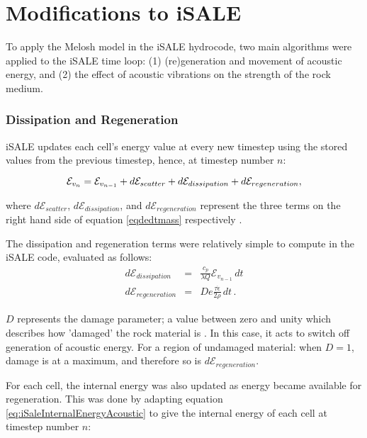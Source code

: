 \appendix

\section{Modifications to iSALE} \label{app:modifications}

To apply the Melosh model in the iSALE hydrocode, two main algorithms were applied to the iSALE time loop: (1) (re)generation and movement of acoustic energy, and (2) the effect of acoustic vibrations on the strength of the rock medium.

\subsubsection{Dissipation and Regeneration \label{sec:dissandregen}}

iSALE updates each cell's energy value at every new timestep using the stored values from the previous timestep, hence, at timestep number $n$:

\begin{equation}\label{eq:iSaleStep}
\mathcal{E}_{v_{n}} = \mathcal{E}_{v_{n-1}} + d\mathcal{E}_{scatter} + d\mathcal{E}_{dissipation} + d\mathcal{E}_{regeneration},\vspace{0.2cm}
\end{equation}

where $d\mathcal{E}_{scatter}$, $d\mathcal{E}_{dissipation}$, and $d\mathcal{E}_{regeneration}$ represent the three terms on the right hand side of equation \ref{eqdedtmass} respectively \citep{collins2003acoustic}.

The dissipation and regeneration terms were relatively simple to compute in the iSALE code, evaluated as follows:
\vspace{0.0cm}
\begin{eqnarray}
d\mathcal{E}_{dissipation} &=& \frac{c_{p}}{\lambda Q}\mathcal{E}_{v_{n-1}}\, dt \\
d\mathcal{E}_{regeneration} &=& De \frac{\tau \dot{\epsilon}}{2\rho}\, dt\, . \label{eq:regen_term}
\end{eqnarray}


$D$ represents the damage parameter; a value between zero and unity which describes how 'damaged' the rock material is \citep{collins2004modeling}. In this case, it acts to switch off generation of acoustic energy. For a region of undamaged material: when $D=1$, damage is at a maximum, and therefore so is $d\mathcal{E}_{regeneration}$.

For each cell, the internal energy was also updated as energy became available for regeneration. This was done by adapting equation \ref{eq:iSaleInternalEnergyAcoustic} to give the internal energy of each cell at timestep number $n$:


